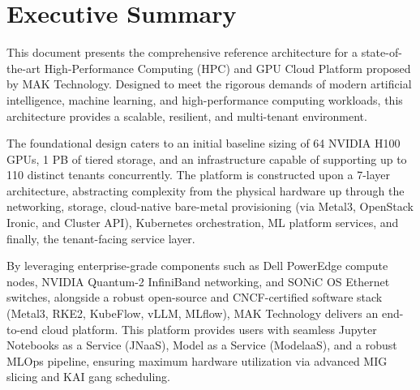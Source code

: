 \chapter{Executive Summary}

This document presents the comprehensive reference architecture for a state-of-the-art High-Performance Computing (HPC) and GPU Cloud Platform proposed by MAK Technology. Designed to meet the rigorous demands of modern artificial intelligence, machine learning, and high-performance computing workloads, this architecture provides a scalable, resilient, and multi-tenant environment.

The foundational design caters to an initial baseline sizing of 64 NVIDIA H100 GPUs, 1 PB of tiered storage, and an infrastructure capable of supporting up to 110 distinct tenants concurrently. The platform is constructed upon a 7-layer architecture, abstracting complexity from the physical hardware up through the networking, storage, cloud-native bare-metal provisioning (via Metal3, OpenStack Ironic, and Cluster API), Kubernetes orchestration, ML platform services, and finally, the tenant-facing service layer.

By leveraging enterprise-grade components such as Dell PowerEdge compute nodes, NVIDIA Quantum-2 InfiniBand networking, and SONiC OS Ethernet switches, alongside a robust open-source and CNCF-certified software stack (Metal3, RKE2, KubeFlow, vLLM, MLflow), MAK Technology delivers an end-to-end cloud platform. This platform provides users with seamless Jupyter Notebooks as a Service (JNaaS), Model as a Service (ModelaaS), and a robust MLOps pipeline, ensuring maximum hardware utilization via advanced MIG slicing and KAI gang scheduling.
